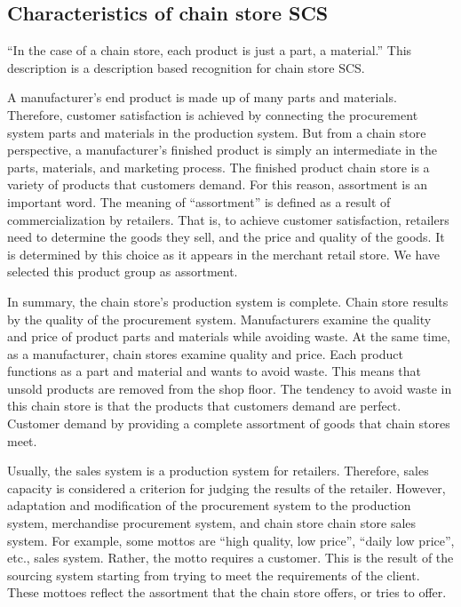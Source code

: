 \documentclass[12pt,a4paper]{article}
\begin{document}
\hypertarget{characteristics-of-chain-store-scs}{%
\subsection{Characteristics of chain store
SCS}\label{characteristics-of-chain-store-scs}}

``In the case of a chain store, each product is just a part, a
material.'' This description is a description based recognition for
chain store SCS.

A manufacturer's end product is made up of many parts and materials.
Therefore, customer satisfaction is achieved by connecting the
procurement system parts and materials in the production system. But
from a chain store perspective, a manufacturer's finished product is
simply an intermediate in the parts, materials, and marketing process.
The finished product chain store is a variety of products that customers
demand. For this reason, assortment is an important word. The meaning of
``assortment'' is defined as a result of commercialization by retailers.
That is, to achieve customer satisfaction, retailers need to determine
the goods they sell, and the price and quality of the goods. It is
determined by this choice as it appears in the merchant retail store. We
have selected this product group as assortment.

In summary, the chain store's production system is complete. Chain store
results by the quality of the procurement system. Manufacturers examine
the quality and price of product parts and materials while avoiding
waste. At the same time, as a manufacturer, chain stores examine quality
and price. Each product functions as a part and material and wants to
avoid waste. This means that unsold products are removed from the shop
floor. The tendency to avoid waste in this chain store is that the
products that customers demand are perfect. Customer demand by providing
a complete assortment of goods that chain stores meet.

Usually, the sales system is a production system for retailers.
Therefore, sales capacity is considered a criterion for judging the
results of the retailer. However, adaptation and modification of the
procurement system to the production system, merchandise procurement
system, and chain store chain store sales system. For example, some
mottos are ``high quality, low price'', ``daily low price'', etc., sales
system. Rather, the motto requires a customer. This is the result of the
sourcing system starting from trying to meet the requirements of the
client. These mottoes reflect the assortment that the chain store
offers, or tries to offer.
\end{document}
